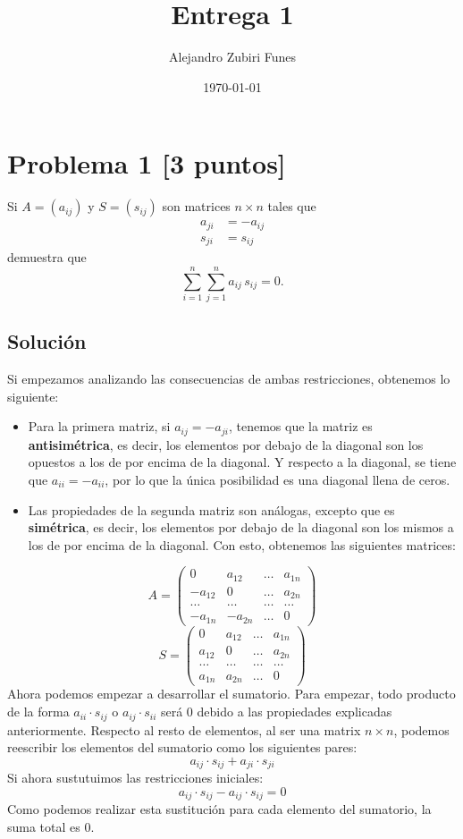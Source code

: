 \documentclass[12pt,reqno]{article}
\title{Entrega 1}
\author{Alejandro Zubiri Funes}
\date{\today}
\begin{document}
	\maketitle
	\section*{Problema 1 [3 puntos]}
	Si $A=(a_{ij})$ y $S=(s_{ij})$ son matrices $n\times n$ tales que
	\begin{align*}
		a_{ji}&=-a_{ij}\\
		s_{ji}&=s_{ij}
	\end{align*}
	demuestra que
	\begin{equation*}
		\sum_{i=1}^{n}\sum_{j=1}^{n} a_{ij}\,s_{ij}=0.
	\end{equation*}
	
	\subsection*{Solución}
Si empezamos analizando las consecuencias de ambas restricciones, obtenemos
lo siguiente:
\begin{itemize}
	\item Para la primera matriz, si $a_{ij}=-a_{ji}$, tenemos que la matriz
		es \textbf{antisimétrica}, es decir, los elementos por debajo de la
		diagonal son los opuestos a los de por encima de la diagonal. Y respecto
		a la diagonal, se tiene que $a_{ii}=-a_{ii}$, por lo que la única
		posibilidad es una diagonal llena de ceros.
	\item Las propiedades de la segunda matriz son análogas, excepto que es
		\textbf{simétrica}, es decir, los elementos por debajo de la diagonal son
		los mismos a los de por encima de la diagonal. Con esto, obtenemos
		las siguientes matrices:
\end{itemize}
\[A=
	\begin{pmatrix} 
		0 & a_{12} & \dots & a_{1n}\\
		-a_{12} & 0 & \dots & a_{2n}\\
		\dots &\dots &\dots &\dots \\
		-a_{1n}&-a_{2n} & \dots & 0
	\end{pmatrix} 
\]
\[S=
	\begin{pmatrix} 
		0 & a_{12} & \dots & a_{1n}\\
		a_{12} & 0 & \dots & a_{2n}\\
		\dots &\dots &\dots &\dots \\
		a_{1n}&a_{2n} & \dots & 0
	\end{pmatrix} 
\]
Ahora podemos empezar a desarrollar el sumatorio. Para empezar, todo producto de
la forma $a_{ii}\cdot s_{ij}$ o $a_{ij}\cdot s_{ii}$ será $0$ debido a las
propiedades explicadas anteriormente. Respecto al resto de elementos, al ser
una matrix $n \times n$, podemos reescribir los elementos del sumatorio como
los siguientes pares:
\[
	a_{ij}\cdot s_{ij} + a_{ji}\cdot s_{ji}
\]
Si ahora sustutuimos las restricciones iniciales:
\[
	a_{ij}\cdot s_{ij}-a_{ij}\cdot s_{ij}=0
\]
Como podemos realizar esta sustitución para cada elemento del sumatorio, la suma total es $0$. 
	\newpage
	
\end{document}
